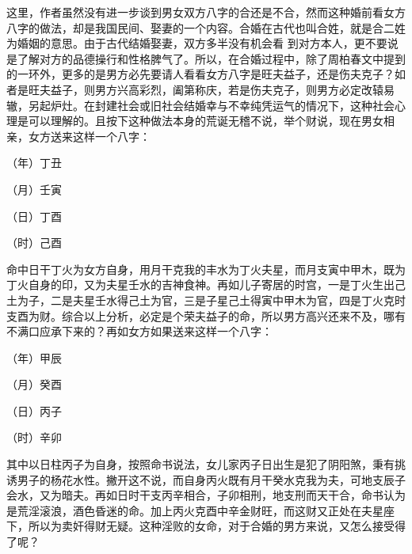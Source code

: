\documentclass[a5paper,oneside,12pt]{ctexbook}
\begin{document}
这里，作者虽然没有进一步谈到男女双方八字的合还是不合，然而这种婚前看女方八字的做法，却是我国民间、娶妻的一个内容。合婚在古代也叫合姓，就是合二姓为婚姻的意思。由于古代结婚娶妻，双方多半没有机会看	到对方本人，更不要说是了解对方的品德操行和性格脾气了。所以，在合婚过程中，除了周柏春文中提到的一环外，更多的是男方必先要请人看看女方八字是旺夫益子，还是伤夫克子？如者是旺夫益子，则男方兴高彩烈，阖第称庆，若是伤夫克子，则男方必定改辕易辙，另起炉灶。在封建社会或旧社会结婚幸与不幸纯凭运气的情况下，这种社会心理是可以理解的。且按下这种做法本身的荒诞无稽不说，举个财说，现在男女相亲，女方送来这样一个八字：\par
（年）丁丑\par
（月）壬寅\par
（日）丁酉\par
（时）己酉\par	
命中日干丁火为女方自身，用月干克我的丰水为丁火夫星，而月支寅中甲木，既为丁火自身的印，又为夫星壬水的吉神食神。再如儿子寄居的时宫，一是丁火生出己土为子，二是夫星壬水得己土为官，三是子星己土得寅中甲木为官，四是丁火克时支酉为财。综合以上分析，必定是个荣夫益子的命，所以男方高兴还来不及，哪有不满口应承下来的？再如女方如果送来这样一个八字：\par
（年）甲辰\par
（月）癸酉\par
（日）丙子\par
（时）辛卯\par
其中以日柱丙子为自身，按照命书说法，女儿家丙子日出生是犯了阴阳煞，秉有挑诱男子的杨花水性。撇开这不说，而自身丙火既有月干癸水克我为夫，可地支辰子会水，又为暗夫。再如日时干支丙辛相合，子卯相刑，地支刑而天干合，命书认为是荒淫滚浪，酒色昏迷的命。加上丙火克酉中辛金财旺，而这财又正处在夫星座下，所以为卖奸得财无疑。这种淫败的女命，对于合婚的男方来说，又怎么接受得了呢？
\end{document}
